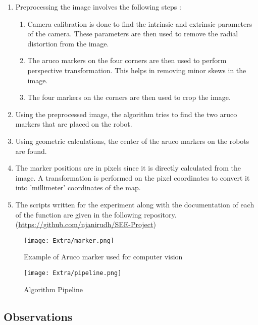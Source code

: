 \begin{enumerate}
		\item
		Preprocessing the image involves the following steps :
		\vspace{0.2cm}
		\begin{enumerate}
			\item
			Camera calibration is done to find the intrinsic and extrinsic parameters of the camera.	These parameters are then used to remove the radial distortion from the image.
			\item
			The aruco markers on the four corners are then used to perform perspective transformation. This helps in removing minor skews in the image.
			\item
			The four markers on the corners are then used to crop the image.			
		\end{enumerate}
		\vspace{0.3cm}
		\item
		Using the preprocessed image, the algorithm tries to find the two aruco markers that are placed on the robot.
		\item
		Using geometric calculations, the center of the aruco markers on the robots are found. 
		\item
		The marker positions are in pixels since it is directly calculated from the image. A transformation is performed on the pixel coordinates to convert it into 'millimeter' coordinates of the map.
		\item
		The scripts written for the experiment along with the documentation of each of the function are given in the following repository. (\href{https://github.com/njanirudh/SEE-Project}{https://github.com/njanirudh/SEE-Project})
\end{enumerate}

\vspace{0.5cm}

\begin{figure}[H]
	\centering
	\texttt{[image: Extra/marker.png]}
	\caption{ Example of Aruco marker used for computer vision}
\end{figure}


\begin{figure}[H]
	\centering
	\texttt{[image: Extra/pipeline.png]}
	\caption{ Algorithm Pipeline}
\end{figure}


\subsection{Observations}

